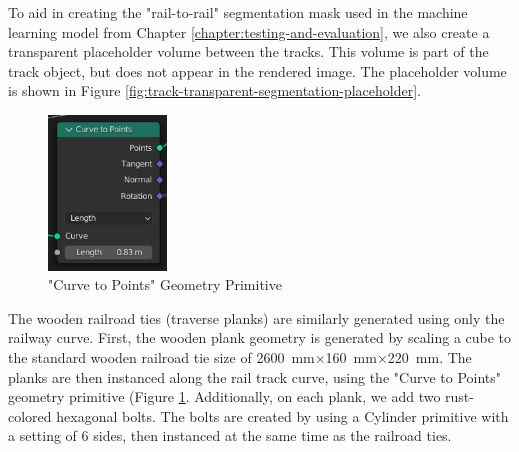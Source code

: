 To aid in creating the "rail-to-rail" segmentation mask used in the machine learning model from Chapter \ref{chapter:testing-and-evaluation}, we also create a transparent placeholder volume between the tracks. This volume is part of the track object, but does not appear in the rendered image. The placeholder volume is shown in Figure \ref{fig:track-transparent-segmentation-placeholder}.


\begin{figure}
    \centering
    \includegraphics[width=0.28\textwidth]{src/img/procedural-tracks/2c-planks-curve-to-points.png}
     \caption{"Curve to Points" Geometry Primitive}
     \label{fig:curve-to-points}
\end{figure}

The wooden railroad ties (traverse planks) are similarly generated using only the railway curve. First, the wooden plank geometry is generated by scaling a cube to the standard wooden railroad tie size of 2600 mm×160 mm×220 mm. The planks are then instanced along the rail track curve, using the "Curve to Points" geometry primitive (Figure \ref{fig:curve-to-points}. Additionally, on each plank, we add two rust-colored hexagonal bolts. The bolts are created by using a Cylinder primitive with a setting of 6 sides, then instanced at the same time as the railroad ties.

